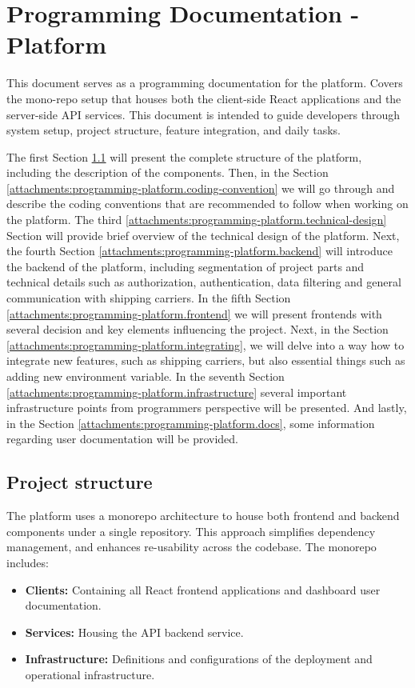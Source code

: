 \chapter{Programming Documentation - Platform}
\label{attachments:programming-platform}
This document serves as a programming documentation for the platform.
Covers the mono-repo setup that houses both the client-side React applications and the server-side API services.
This document is intended to guide developers through system setup, project structure, feature integration, and daily tasks.

The first Section \ref{attachments:programming-platform.project-structure} will present the complete structure of the platform, including the description of the components.
Then, in the Section \ref{attachments:programming-platform.coding-convention} we will go through and describe the coding conventions that are recommended to follow when working on the platform.
The third \ref{attachments:programming-platform.technical-design} Section will provide brief overview of the technical design of the platform.
Next, the fourth Section \ref{attachments:programming-platform.backend} will introduce the backend of the platform, including segmentation of project parts and technical details such as authorization, authentication, data filtering and general communication with shipping carriers.
In the fifth Section \ref{attachments:programming-platform.frontend} we will present frontends with several decision and key elements influencing the project.
Next, in the Section \ref{attachments:programming-platform.integrating}, we will delve into a way how to integrate new features, such as shipping carriers, but also essential things such as adding new environment variable.
In the seventh Section \ref{attachments:programming-platform.infrastructure} several important infrastructure points from programmers perspective will be presented.
And lastly, in the Section \ref{attachments:programming-platform.docs}, some information regarding user documentation will be provided. 


\section{Project structure}
\label{attachments:programming-platform.project-structure}
The platform uses a monorepo architecture to house both frontend and backend components under a single repository.
This approach simplifies dependency management, and enhances re-usability across the codebase.
The monorepo includes:
\begin{itemize}
    \item \textbf{Clients:} Containing all React frontend applications and dashboard user documentation.
    \item \textbf{Services:} Housing the API backend service.
    \item \textbf{Infrastructure:} Definitions and configurations of the deployment and operational infrastructure.
\end{itemize}

